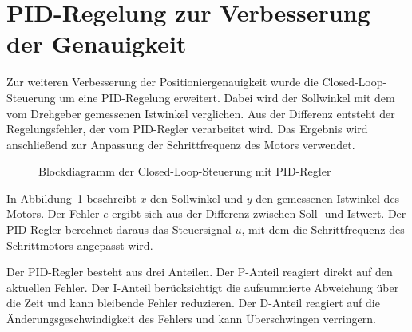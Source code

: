 \documentclass[a4paper,12pt]{article}
\begin{document}
\section{PID-Regelung zur Verbesserung der Genauigkeit}

Zur weiteren Verbesserung der Positioniergenauigkeit wurde die Closed-Loop-Steuerung um eine PID-Regelung erweitert. Dabei wird der Sollwinkel mit dem vom Drehgeber gemessenen Istwinkel verglichen. Aus der Differenz entsteht der Regelungsfehler, der vom PID-Regler verarbeitet wird. Das Ergebnis wird anschließend zur Anpassung der Schrittfrequenz des Motors verwendet.

\begin{figure}[H]
\centering


\caption{Blockdiagramm der Closed-Loop-Steuerung mit PID-Regler}
\label{fig:pid_closed_loop}
\end{figure}

In Abbildung~\ref{fig:pid_closed_loop} beschreibt \(x\) den Sollwinkel und \(y\) den gemessenen Istwinkel des Motors. Der Fehler \(e\) ergibt sich aus der Differenz zwischen Soll- und Istwert. Der PID-Regler berechnet daraus das Steuersignal \(u\), mit dem die Schrittfrequenz des Schrittmotors angepasst wird.

Der PID-Regler besteht aus drei Anteilen. Der P-Anteil reagiert direkt auf den aktuellen Fehler. Der I-Anteil berücksichtigt die aufsummierte Abweichung über die Zeit und kann bleibende Fehler reduzieren. Der D-Anteil reagiert auf die Änderungsgeschwindigkeit des Fehlers und kann Überschwingen verringern.
\end{document}
